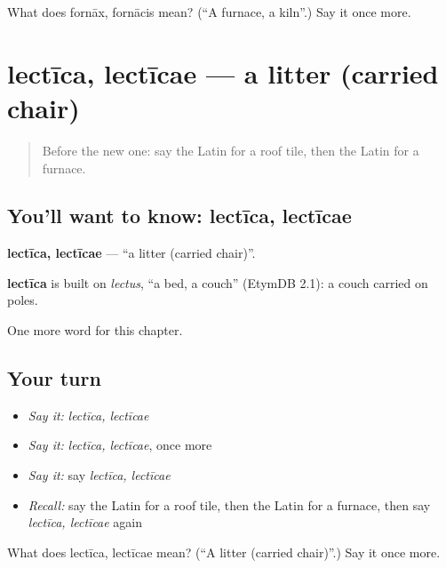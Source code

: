 \begin{tcolorbox}[breakable,colback=teal!4,colframe=teal!35!black,title={Before you move on}]
What does fornāx, fornācis mean? (\textquotedblleft{}A furnace, a kiln\textquotedblright{}.) Say it once more.
\end{tcolorbox}
\section[lectīca, lectīcae]{lectīca, lectīcae — a litter (carried chair)}

\label{lesson:LA-C217-lectica}



\begin{quote}
Before the new one: say the Latin for a roof tile, then the Latin for a furnace.
\end{quote}

\subsection*{You'll want to know: lectīca, lectīcae}
\textbf{lectīca, lectīcae} — \textquotedblleft{}a litter (carried chair)\textquotedblright{}.

\begin{cousinweb}
\textbf{lectīca} is built on \emph{lectus}, \textquotedblleft{}a bed, a couch\textquotedblright{} (EtymDB 2.1): a couch carried on poles.
\end{cousinweb}

\begin{grammarlens}[title={What you've built}]
One more word for this chapter.
\end{grammarlens}

\subsection*{Your turn}
\begin{itemize}
\raggedright
  \item \emph{Say it:} \emph{lectīca, lectīcae}
  \item \emph{Say it:} \emph{lectīca, lectīcae}, once more
  \item \emph{Say it:} say \emph{lectīca, lectīcae}
  \item \emph{Recall:} say the Latin for a roof tile, then the Latin for a furnace, then say \emph{lectīca, lectīcae} again
\end{itemize}

\begin{tcolorbox}[breakable,colback=teal!4,colframe=teal!35!black,title={Before you move on}]
What does lectīca, lectīcae mean? (\textquotedblleft{}A litter (carried chair)\textquotedblright{}.) Say it once more.
\end{tcolorbox}

